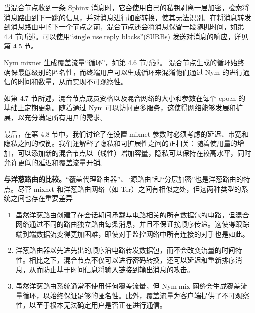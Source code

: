 \documentclass{article}
\begin{document}
	当混合节点收到一条 Sphinx 消息时，它会使用自己的私钥剥离一层加密，检索将消息路由到下一跳的信息，并对消息进行加密转换，使其无法识别。在将消息转发到消息路由中的下一个节点之前，混合节点还会将消息保留一段随机时间，如第 4.4 节所述。可以使用“single use reply blocks”(SURBs) 发送对消息的响应，详见第 4.5 节。\newline

	Nym mixnet 生成覆盖流量“循环”，如第 4.6 节所述。 混合节点生成的循环始终确保最低级别的匿名性，而终端用户可以生成循环来混淆他们通过 Nym 的进行通信的时间和数量，从而实现不可观察性。\newline

	如第 4.7 节所述，混合节点成员资格以及混合网络的大小和参数在每个 epoch 的基础上定期更新。随着通过 Nym 可以访问更多服务，这使得网络能够发展和扩展，以充分满足所有用户的需求。\newline

	最后，在第 4.8 节中，我们讨论了在设置 mixnet 参数时必须考虑的延迟、带宽和隐私之间的权衡。我们还解释了隐私和可扩展性之间的正相关：随着使用量的增加，可以添加新的混合节点以（线性）增加容量，隐私可以保持在较高水平，同时允许更低的延迟和覆盖流量开销。\newline

	\textbf{与洋葱路由的比较。}“覆盖代理路由器”、“源路由”和“分层加密”也是洋葱路由的特点。尽管 mixnet 和洋葱路由网络（如 Tor）之间有相似之处，但这两种类型的系统之间也存在重要差异：
	
\begin{enumerate}[1. ]
\item 虽然洋葱路由创建了在会话期间承载与电路相关的所有数据包的电路，但混合网络通过不同的路由独立路由每条消息，并且不保证按顺序传递。这使得跟踪端到端数据流变得更加困难，即使对于监控网络中所有连接的对手也是如此。
\item 洋葱路由器以先进先出的顺序沿电路转发数据包，而不会改变流量的时间特性。相比之下，混合节点不仅可以进行密码转换，还可以延迟和重新排序消息，从而防止基于时间信息将输入链接到输出消息的攻击。
\item 虽然洋葱路由系统通常不使用任何覆盖流量，但 Nym mix 网络会生成覆盖流量循环，以始终保证足够的匿名性。此外，覆盖流量为客户端提供了不可观察性，以至于根本无法确定用户是否正在进行通信。
\end{enumerate}
\end{document}
